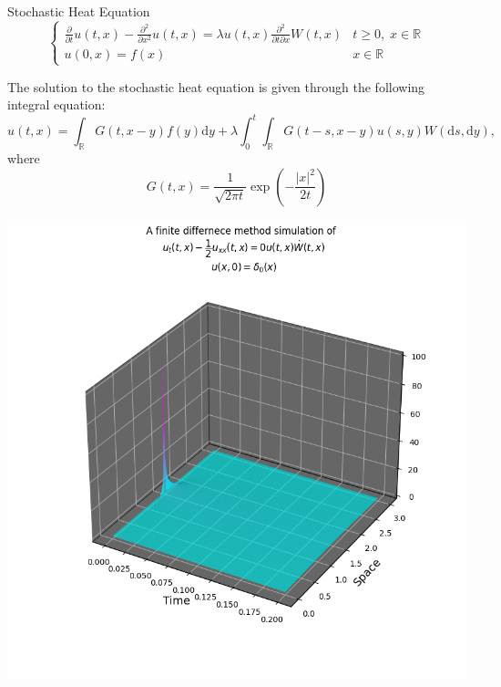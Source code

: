 \documentclass{beamer}%
\numberwithin{equation}{section}
\newcommand{\R}{\mathbb{R}}
\newcommand{\ud}{\ensuremath{\mathrm{d} }}
\begin{document}
\begin{frame}[t]{Stochastic Heat Equation}
	\[
	\begin{cases}
		\frac{\partial}{\partial t} u(t,x) - \frac{\partial^2}{\partial x^2} u(t,x) = \lambda u(t,x) \frac{\partial^2}{\partial t \partial x}W(t,x) & t \ge 0, \; x\in \R \\
		u(0, x) = f(x) & x \in \R
	\end{cases}
	\]
\vspace{.1 in}

The solution to the stochastic heat equation is given through the following integral equation:
	\[
		u(t,x) = \int_{\R} G(t, x-y) f(y) \ud y + \lambda \int_0^t \int_{\R} G(t-s,x-y) u(s,y) W(\ud s, \ud y),
	\]
where
	\[
		G(t,x) = \frac{1}{\sqrt{2 \pi t} }\exp\left(-\frac{|x|^2}{2t}\right)
	\]
\end{frame}

\begin{frame}
	\centering
	\includegraphics[scale=.5]{SHEdeltaNoise0.png}
\end{frame}
\end{document}
